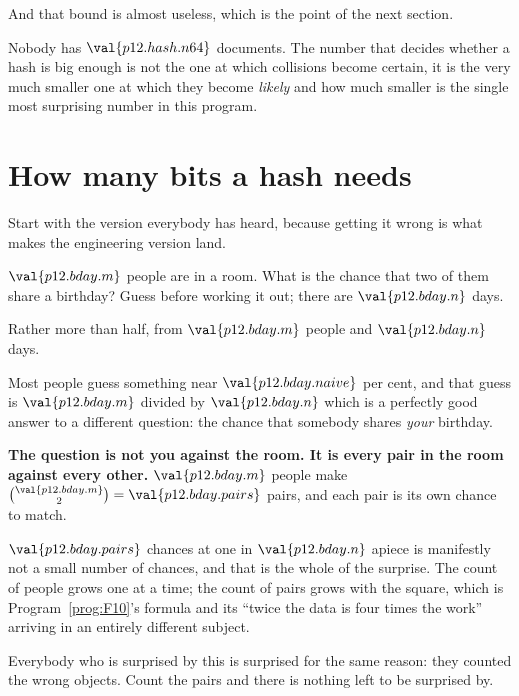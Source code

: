 \begin{fr}
And that bound is almost useless, which is the point of the next section.

Nobody has $\val{p12.hash.n64}$ documents. The number that decides whether a
hash is big enough is not the one at which collisions become certain, it is
the very much smaller one at which they become \emph{likely} \dash{} and how
much smaller is the single most surprising number in this program.
\end{fr}

\section{How many bits a hash needs}
\label{sec:P12-birthday}

\begin{fr}
Start with the version everybody has heard, because getting it wrong is what
makes the engineering version land.

$\val{p12.bday.m}$ people are in a room. What is the chance that two of them
share a birthday? Guess before working it out; there are
$\val{p12.bday.n}$ days.
\dotline
\nextframe
\end{fr}

\begin{fr}
Rather more than half, from $\val{p12.bday.m}$ people and
$\val{p12.bday.n}$ days.

Most people guess something near $\val{p12.bday.naive}$ per cent, and that
guess is $\val{p12.bday.m}$ divided by $\val{p12.bday.n}$ \dash{} which is a
perfectly good answer to a different question: the chance that somebody shares
\emph{your} birthday.

\begin{trapbox}
\textbf{The question is not you against the room. It is every pair in the room
against every other.} $\val{p12.bday.m}$ people make
$\binom{\val{p12.bday.m}}{2} = \val{p12.bday.pairs}$ pairs, and each pair is
its own chance to match.

$\val{p12.bday.pairs}$ chances at one in $\val{p12.bday.n}$ apiece is
manifestly not a small number of chances, and that is the whole of the
surprise. The count of people grows one at a time; the count of pairs grows
with the square, which is Program~\ref{prog:F10}'s formula and its
\enquote{twice the data is four times the work} arriving in an entirely
different subject.

Everybody who is surprised by this is surprised for the same reason: they
counted the wrong objects. Count the pairs and there is nothing left to be
surprised by.
\end{trapbox}

\end{fr}

